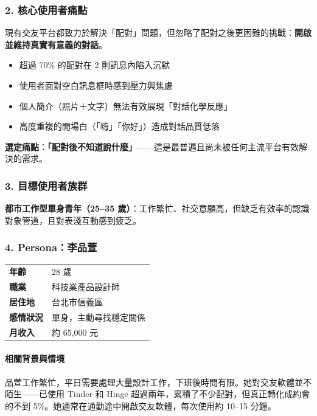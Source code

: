 \documentclass[12pt, a4paper]{article}
\begin{document}
\subsubsection*{2. 核心使用者痛點}

現有交友平台都致力於解決「配對」問題，但忽略了配對之後更困難的挑戰：\textbf{開啟並維持真實有意義的對話}。

\begin{itemize}[leftmargin=2em]
  \item 超過 70\% 的配對在 2 則訊息內陷入沉默
  \item 使用者面對空白訊息框時感到壓力與焦慮
  \item 個人簡介（照片＋文字）無法有效展現「對話化學反應」
  \item 高度重複的開場白（「嗨」「你好」）造成對話品質低落
\end{itemize}

\textbf{選定痛點}：\textbf{「配對後不知道說什麼」}——這是最普遍且尚未被任何主流平台有效解決的需求。

\subsubsection*{3. 目標使用者族群}

\textbf{都市工作型單身青年（25--35 歲）}：工作繁忙、社交意願高，但缺乏有效率的認識對象管道，且對表淺互動感到疲乏。

\subsubsection*{4. Persona：李品萱}

\begin{tcolorbox}[colback=lightblue, colframe=accent, title=Persona --- 李品萱（Pinxuan Lee）]
\begin{tabular}{ll}
\textbf{年齡} & 28 歲 \\
\textbf{職業} & 科技業產品設計師 \\
\textbf{居住地} & 台北市信義區 \\
\textbf{感情狀況} & 單身，主動尋找穩定關係 \\
\textbf{月收入} & 約 65,000 元 \\
\end{tabular}
\end{tcolorbox}

\paragraph{相關背景與情境}
品萱工作繁忙，平日需要處理大量設計工作，下班後時間有限。她對交友軟體並不陌生——已使用 Tinder 和 Hinge 超過兩年，累積了不少配對，但真正轉化成約會的不到 5\%。她通常在通勤途中開啟交友軟體，每次使用約 10--15 分鐘。
\end{document}
